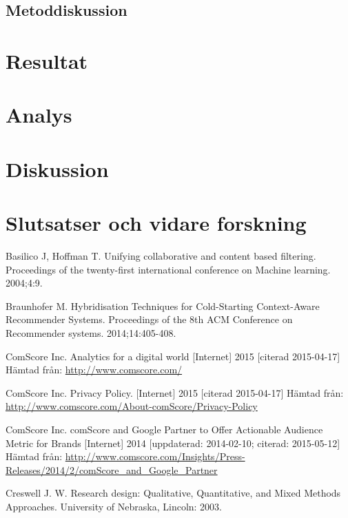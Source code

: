\documentclass[a4paper,11pt]{article}
\begin{document}
{\subsection{Metoddiskussion}

\section{Resultat}

\section{Analys}

\section{Diskussion}

\section{Slutsatser och vidare forskning}


%
\newpage
{}
\begin{thebibliography}{888}
%

 Basilico J, Hoffman T. Unifying collaborative and content based filtering. Proceedings of the twenty-first international conference on Machine learning. 2004;4:9. 

 Braunhofer M. Hybridisation Techniques for Cold-Starting Context-Aware Recommender Systems. Proceedings of the 8th ACM Conference on Recommender systems. 2014;14:405-408.

 ComScore Inc. Analytics for a digital world [Internet] 2015 [citerad 2015-04-17] Hämtad från: \url{http://www.comscore.com/}

 ComScore Inc. Privacy Policy. [Internet] 2015 [citerad 2015-04-17] Hämtad från: \url{http://www.comscore.com/About-comScore/Privacy-Policy}

 ComScore Inc. comScore and Google Partner to Offer Actionable Audience Metric for Brands [Internet] 2014 [uppdaterad: 2014-02-10; citerad: 2015-05-12] Hämtad från: \url{http://www.comscore.com/Insights/Press-Releases/2014/2/comScore_and_Google_Partner}

 Creswell J. W. Research design: Qualitative, Quantitative, and Mixed Methods Approaches. University of Nebraska, Lincoln: 2003.


\end{thebibliography}}
\end{document}
